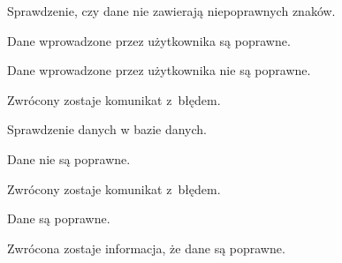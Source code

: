 \documentclass[12pt, a4paper]{article} %
\begin{document}
\hfill \break
\begin{usecase}
	\noaka
	\addpath
	\begin{usecases}
		\item Sprawdzenie, czy dane nie zawierają niepoprawnych znaków.
		\item Dane wprowadzone przez użytkownika są poprawne.
		\begin{usecases}
			\item Dane wprowadzone przez użytkownika nie są poprawne.
			\begin{usecases}
				\item Zwrócony zostaje komunikat z~błędem.
			\end{usecases}
		\end{usecases}
		\item Sprawdzenie danych w bazie danych.
		\begin{usecases}
			\item Dane nie są poprawne.
			\begin{usecases}
				\item Zwrócony zostaje komunikat z~błędem.
			\end{usecases}
		\end{usecases}
		\item Dane są poprawne.
		\item Zwrócona zostaje informacja, że dane są poprawne.
	\end{usecases}
\end{usecase}
\end{document}
